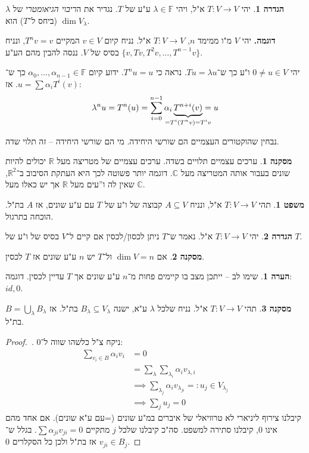 \documentclass[a4paper]{article}
\newcommand\R     {\mathbb{R}}
\newcommand\C     {\mathbb{C}}
\newcommand\F         {\mathbb{F}}
\newcommand\co        {\colon}
\newcommand\ag        {\alpha}
\renewcommand\lg      {\lambda}
\theoremstyle{definition}
\newtheorem{Theorem}{משפט}
\newtheorem{definition}{הגדרה}
\newtheorem{Remark}{הערה}
\newtheorem{Collary}{מסקנה}
\newcommand\cola [1] {\begin{Collary}#1\end{Collary}}
\newcommand\theo  [1] {\begin{Theorem}#1\end{Theorem}}
\newcommand\defi  [1] {\begin{definition}#1\end{definition}}
\newcommand\rmark [1] {\begin{Remark}#1\end{Remark}}
\begin{document}
	\defi{יהי $T \co V \to V$ א"ל, ויהי $\lg \in \F$ ע"ע של $T$. נגדיר את ה\textit{ריבוי הגיאומטרי} של $\lg$ (ביחס ל־$T$) הוא $\dim V_\lg$. }
	
	\textbf{דוגמה.}
	יהי $V$ מ"ו ממימד $n$, $T \co V \to V$ א"ל. נניח קיום $v \in V $ המקיים $T^nv = v$, ונניח $\{v, Tv, T^2v, \dots, T^{n - 1}v\}$ בסיס של $V$. ננסה להבין מהם הע"ע. 
	
	יהי $0 \neq u \in V$ ו"ע כך ש־$Tu = \lg u$. נראה כי $T^nu = u$. ידוע קיום $\ag_0, \dots, \ag_{n - 1} \in \F$ כך ש־$u = \sum \ag_iT^i(v)$. אז: 
	\[ \lg^nu = T^n(u) = \sum_{i = 0}^{n - 1}\ag_i\underbrace{T^{n + i}(v)}_{\mathclap{= T^i(T^nv) = T^iv}} = u \]
	
	נבחין שהוקטורים העצמיים הם שורשי היחידה. מי הם שורשי היחידה – זה תלוי שדה. 
	
	\cola{ערכים עצמיים תלויים בשדה. ערכים עצמיים של מטריצה מעל $\R$ יכולים להיות שונים בעבור אותה המטריצה מעל $\C$. דוגמה יותר פשוטה לכך היא העתקת הסיבוב ב־$\R^2$, שאין לה ו''עים מעל $\R$ אך יש כאלו מעל $\C$. }
	
	\theo{תהי $T \co V \to V$ א"ל, ונניח $A \subseteq V$ קבוצה של ו"ע של $T$ עם ע"ע שונים, אז $A$ בת"ל. הוכחה בתרגול. }
	
	\defi{יהי $T \co V \to V$ א"ל. נאמר ש־$T$ ניתן לכסון/לכסין אם קיים ל־$V$ בסיס של ו"ע של $T$. }
	
	\cola{אם $\dim V = n$ ול־$T$ יש $n$ ע"ע שונים אז $T$ לכסין. }
	
	\rmark{שימו לב – ייתכן מצב בו קיימים פחות מ־$n$ ע"ע שונים אך $T$ עדיין לכסין. דוגמה: $id, 0$. }
	
	\cola{תהי $T \co V \to V$ א"ל. נניח שלכל $\lg$ ע"א, ישנה $B_\lg \subseteq V_\lg$ בת"ל. אז $B = \bigcup_{\lg}B_\lg$ בת"ל. }
	
	\begin{proof}\,\!. ניקח צ"ל כלשהו שווה ל־0: 
		\begin{align*}
			\sum_{v_i \in B} \ag_iv_i &= 0 \\
			&= \sum_{\lg}\sum_{\lg_i}\ag_iv_{\lg, i} \\
			&\implies \sum_{\lg_j}\ag_i v_{\lg_{ji}} =: u_j \in V_{\lg_j} \\
			&\implies \sum_{j}u_j = 0
		\end{align*}
		קיבלנו צירוף ליניארי לא טרוויאלי של איברים במ"ע שונים (=עם ע"א שונים). אם אחד מהם אינו 0, קיבלנו סתירה למשפט. סה"כ קיבלנו שלכל $j$ מתקיים $\sum \ag_{ji}v_{ji} = 0$. בגלל ש־$v_{ji} \in B_j$ אז בת"ל ולכן כל הסקלרים 0. 
	\end{proof}
	
\end{document}

